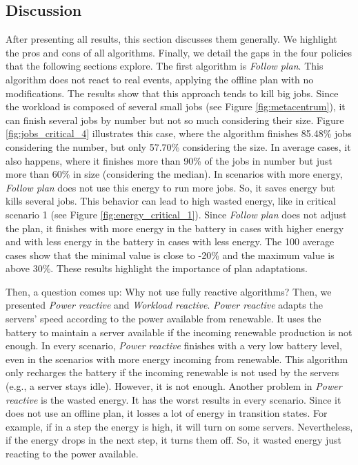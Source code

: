 \clearpage

\subsection{Discussion}
\label{sec:compensation_discussion}

After presenting all results, this section discusses them generally. We highlight the pros and cons of all algorithms. Finally, we detail the gaps in the four policies that the following sections explore. The first algorithm is \emph{Follow plan}. This algorithm does not react to real events, applying the offline plan with no modifications. The results show that this approach tends to kill big jobs. Since the workload is composed of several small jobs (see Figure \ref{fig:metacentrum}), it can finish several jobs by number but not so much considering their size. Figure \ref{fig:jobs_critical_4} illustrates this case, where the algorithm finishes 85.48\% jobs considering the number, but only 57.70\% considering the size. In average cases, it also happens, where it finishes more than 90\% of the jobs in number but just more than 60\% in size (considering the median). In scenarios with more energy, \emph{Follow plan} does not use this energy to run more jobs. So, it saves energy but kills several jobs. This behavior can lead to high wasted energy, like in critical scenario 1 (see Figure \ref{fig:energy_critical_1}). Since \emph{Follow plan} does not adjust the plan, it finishes with more energy in the battery in cases with higher energy and with less energy in the battery in cases with less energy. The 100 average cases show that the minimal value is close to -20\% and the maximum value is above 30\%. These results highlight the importance of plan adaptations.

Then, a question comes up: Why not use fully reactive algorithms? Then, we presented \emph{Power reactive} and \emph{Workload reactive}. \emph{Power reactive} adapts the servers' speed according to the power available from renewable. It uses the battery to maintain a server available if the incoming renewable production is not enough. In every scenario, \emph{Power reactive} finishes with a very low battery level, even in the scenarios with more energy incoming from renewable. This algorithm only recharges the battery if the incoming renewable is not used by the servers (e.g., a server stays idle). However, it is not enough. Another problem in \emph{Power reactive} is the wasted energy. It has the worst results in every scenario. Since it does not use an offline plan, it losses a lot of energy in transition states. For example, if in a step the energy is high, it will turn on some servers. Nevertheless, if the energy drops in the next step, it turns them off. So, it wasted energy just reacting to the power available.

